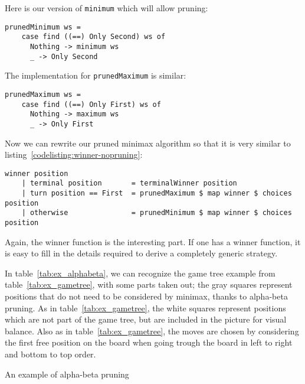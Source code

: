 Here is our version of \texttt{minimum} which will allow pruning:
\begin{lstlisting}[frame=single, label={codelisting:prunedminimum}]
  prunedMinimum ws = 
    case find ((==) Only Second) ws of
      Nothing -> minimum ws
      _ -> Only Second
\end{lstlisting}
The implementation for \texttt{prunedMaximum} is similar:
\begin{lstlisting}[frame=single, label={codelisting:prunedmaximum}]
  prunedMaximum ws = 
    case find ((==) Only First) ws of
      Nothing -> maximum ws
      _ -> Only First
\end{lstlisting}
Now we can rewrite our pruned minimax algorithm so that it is very similar to listing~\ref{codelisting:winner-nopruning}:

\begin{minipage}{\linewidth}
\begin{lstlisting}[frame=single, caption={Winner function (with pruning)}, label={codelisting:winner-pruning}]
  winner position
    | terminal position       = terminalWinner position
    | turn position == First  = prunedMaximum $ map winner $ choices position
    | otherwise               = prunedMinimum $ map winner $ choices position
\end{lstlisting}
\end{minipage}
Again, the winner function is the interesting part. If one has a winner function, it is easy to fill in the details required to derive a completely generic strategy.

In table~\ref{tab:ex_alphabeta}, we can recognize the game tree example from table~\ref{tab:ex_gametree}, with some parts taken out; the gray squares represent positions that do not need to be considered by minimax, thanks to alpha-beta pruning.
As in table~\ref{tab:ex_gametree}, the white squares represent positions which are not part of the game tree, but are included in the picture for visual balance.
Also as in table~\ref{tab:ex_gametree}, the moves are chosen by considering the first free position on the board when going trough the board in left to right and bottom to top order.

\begin{center}
\def\arraystretch{5.5}
\begin{table}
\def\svgwidth{\columnwidth} 
\caption{An example of alpha-beta pruning}
\label{tab:ex_alphabeta}
\end{table}
\end{center}
